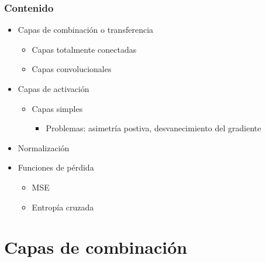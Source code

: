 \documentclass[svgnames,12pt,aspectratio=149]{beamer}
\begin{document}
\begin{frame}
  \frametitle{Contenido}

  \begin{itemize}
  \item Capas de combinación o transferencia
   \begin{itemize}
  \item Capas totalmente conectadas
  \item Capas convolucionales
  \end{itemize}
  \item Capas de activación
  \begin{itemize}
  \item Capas simples
 	\begin{itemize}
  \item Problemas: asimetría postiva, desvanecimiento del gradiente
  \end{itemize}
  \end{itemize}
  \item Normalización
  \item Funciones de pérdida
  \begin{itemize}
  \item MSE
  \item Entropía cruzada
  \end{itemize}
  \end{itemize}
\end{frame}
\section{Capas de combinación}
\end{document}
